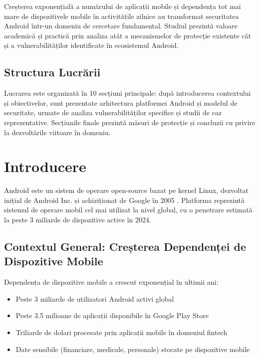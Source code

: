 \documentclass[11pt,a4paper,twocolumn]{article}
\theoremstyle{definition}
\theoremstyle{plain}
\theoremstyle{remark}
\begin{document}
Creșterea exponențială a numărului de aplicații mobile și dependența tot mai mare de 
dispozitivele mobile în activitățile zilnice au transformat securitatea Android într-un domeniu 
de cercetare fundamental. Studiul prezintă valoare academică și practică prin analiza atât a 
mecanismelor de protecție existente cât și a vulnerabilităților identificate în ecosistemul Android.

\subsection{Structura Lucrării}

Lucrarea este organizată în 10 secțiuni principale: după introducerea contextului și 
obiectivelor, sunt prezentate arhitectura platformei Android și modelul de securitate, 
urmate de analiza vulnerabilităților specifice și studii de caz reprezentative. Secțiunile 
finale prezintă măsuri de protecție și concluzii cu privire la dezvoltările viitoare în domeniu.

\section{Introducere}

Android este un sistem de operare open-source bazat pe kernel Linux, dezvoltat inițial de 
Android Inc. și achiziționat de Google în 2005 \cite{android_history}. Platforma reprezintă 
sistemul de operare mobil cel mai utilizat la nivel global, cu o penetrare estimată la peste 
3 miliarde de dispozitive active în 2024.

\subsection{Contextul General: Creșterea Dependenței de Dispozitive Mobile}

Dependența de dispozitive mobile a crescut exponențial în ultimii ani:
\begin{itemize}
    \item Peste 3 miliarde de utilizatori Android activi global
    \item Peste 3.5 milioane de aplicații disponibile în Google Play Store
    \item Triliarde de dolari procesate prin aplicații mobile în domeniul fintech
    \item Date sensibile (financiare, medicale, personale) stocate pe dispozitive mobile
\end{itemize}
\end{document}
